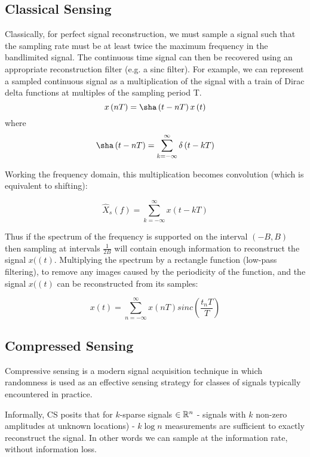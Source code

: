 \subsection{Classical Sensing}
Classically, for perfect signal reconstruction, we must sample a signal such that the sampling rate must be at least twice the maximum frequency in the bandlimited signal. The continuous time signal can then be recovered using an appropriate reconstruction filter (e.g. a sinc filter). For example, we can represent a sampled continuous signal as a multiplication of the signal with a train of Dirac delta functions at multiples of the sampling period T.
%
\begin{equation}
x\left(nT\right) = \sha\left(t-nT\right)x\left(t\right)
\end{equation}
%
where
%
\begin{equation}
\sha\left(t-nT\right) = \sum_{k=-\infty}^{\infty} \delta\left(t - kT\right)
\end{equation}

Working the frequency domain, this multiplication becomes convolution (which is equivalent to shifting):

\begin{equation}
\hat{X}_{s}\left(f\right) = \sum_{k=-\infty}^\infty x\left(t - kT\right)
\end{equation}

Thus if the spectrum of the frequency is supported on the interval \(\left(-B, B\right)\) then sampling at intervals \(\frac{1}{2B}\) will contain enough information to reconstruct the signal \(x(\left(t\right)\). Multiplying the spectrum by a rectangle function (low-pass filtering), to remove any images caused by the periodicity of the function, and the signal \(x(\left(t\right)\) can be reconstructed from its samples:

\begin{equation}
x\left(t\right) = \sum_{n=-\infty}^\infty x\left(nT\right) sinc\left(\frac{t_nT}{T}\right)
\end{equation}

\subsection{Compressed Sensing}

Compressive sensing is a modern signal acquisition technique in which randomness is used as an effective sensing strategy for classes of signals typically encountered in practice.

Informally, CS posits that for \(k\)-sparse signals \(\in {\mathbb{R}}^{n}\) - signals with \(k\) non-zero amplitudes at unknown locations) - \(k\log{n}\) measurements are sufficient to exactly reconstruct the signal. In other words we can sample at the information rate, without information loss.

